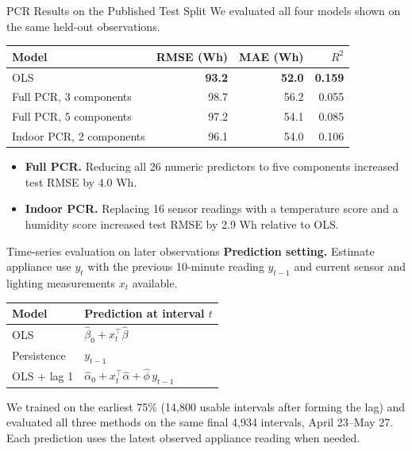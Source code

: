 \documentclass[aspectratio=169,11pt]{beamer}
\begin{document}
\begin{frame}{PCR Results on the Published Test Split}
    We evaluated all four models shown on the same held-out observations.

    \begin{center}
        \renewcommand{\arraystretch}{1.2}
        \begin{tabular}{@{}lrrr@{}}
            \toprule
            Model & RMSE (Wh) & MAE (Wh) & $R^2$ \\
            \midrule
            OLS                      & \textbf{93.2} & \textbf{52.0} & \textbf{0.159} \\
            Full PCR, 3 components   & 98.7 & 56.2 & 0.055 \\
            Full PCR, 5 components   & 97.2 & 54.1 & 0.085 \\
            Indoor PCR, 2 components & 96.1 & 54.0 & 0.106 \\
            \bottomrule
        \end{tabular}
    \end{center}

    \begin{itemize}
        \item \textbf{Full PCR.} Reducing all 26 numeric predictors to
              five components increased test RMSE by 4.0 Wh.
        \item \textbf{Indoor PCR.} Replacing 16 sensor readings with a
              temperature score and a humidity score increased test RMSE
              by 2.9 Wh relative to OLS.
    \end{itemize}
\end{frame}

\begin{frame}{Time-series evaluation on later observations}
\textbf{Prediction setting.} Estimate appliance use $y_t$ with the previous 10-minute reading $y_{t-1}$ and current sensor and lighting measurements $x_t$ available.
\medskip

\begin{tabular}{@{}ll@{}}
\toprule
Model & Prediction at interval $t$\\\midrule
OLS & $\hat\beta_0+x_t^\top\hat\beta$\\
Persistence & $y_{t-1}$\\
OLS + lag 1 & $\hat\alpha_0+x_t^\top\hat\alpha+\hat\phi\,y_{t-1}$\\\bottomrule
\end{tabular}
\medskip

We trained on the earliest 75\% (14,800 usable intervals after forming the lag) and evaluated all three methods on the same final 4,934 intervals, April 23--May 27. Each prediction uses the latest observed appliance reading when needed.
\end{frame}
\end{document}
